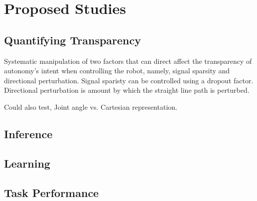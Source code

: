 \documentclass[12pt]{article}
\begin{document}
\pagebreak
\section{Proposed Studies}
\subsection{Quantifying Transparency}
Systematic manipulation of two factors that can direct affect the transparency of autonomy's intent when controlling the robot, namely, signal sparsity and directional perturbation. Signal sparisty can be controlled using a dropout factor. Directional perturbation is amount by which the straight line path is perturbed. 

Could also test, Joint angle vs. Cartesian representation. 
\subsection{Inference}

\subsection{Learning}

\subsection{Task Performance}
\end{document}

